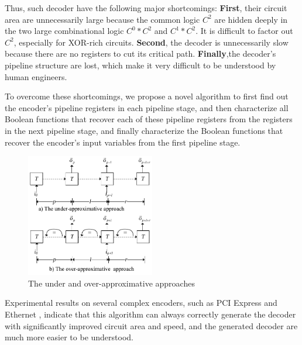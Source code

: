 \documentclass[twocolumn]{article}
\begin{document}
Thus,
such decoder have the following major shortcomings:
 \textbf{First}, their circuit area are unnecessarily large because 
 the common logic $C^2$ are hidden deeply in
 the two large combinational logic $C^0*C^2$ and $C^1*C^2$.
 It is difficult to factor out $C^2$, 
 especially for XOR-rich circuits.
 \textbf{Second}, the decoder is unnecessarily slow because 
 there are no registers to cut its critical path.
 \textbf{Finally},the decoder's pipeline structure are lost, 
 which make it very difficult to be understood by human engineers.

To overcome these shortcomings,
we propose a novel algorithm to first find out the encoder's pipeline registers in each pipeline stage,
and then characterize all Boolean functions that recover each of these pipeline registers
from the registers in the next pipeline stage,
and finally characterize the Boolean functions that recover the encoder's input variables 
from the first pipeline stage.

\begin{figure}[t]
\begin{center}
\includegraphics[width=0.5\textwidth]{pcln}
\end{center}
\caption{The under and over-approximative approaches}
  \label{fig_pc}
\end{figure}

Experimental results on several complex encoders,
such as PCI Express \cite{pcie21} and Ethernet \cite{IEEE8023_S4},
indicate that
this algorithm can always correctly generate the decoder with significantly improved
circuit area and speed,
and the generated decoder are much more easier to be understood.
\end{document}
